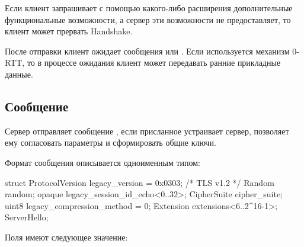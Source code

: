 
Если клиент запрашивает с помощью какого-либо расширения дополнительные 
функциональные возможности, а сервер эти возможности не предоставляет, то 
клиент может прервать Handshake.

После отправки  клиент ожидает сообщения
 или . Если
используется механизм 0-RTT, то в процессе ожидания клиент может передавать
ранние прикладные данные.

\subsection{Сообщение }\label{HS.SH} 

Сервер отправляет сообщение , если присланное 
 устраивает сервер, позволяет ему
согласовать параметры и сформировать общие ключи.

Формат сообщения  описывается одноименным типом:
%
\begin{codeblock}
struct {
  ProtocolVersion legacy_version = 0x0303;    /* TLS v1.2 */
  Random random;
  opaque legacy_session_id_echo<0..32>;
  CipherSuite cipher_suite;
  uint8 legacy_compression_method = 0;
  Extension extensions<6..2^16-1>;
} ServerHello;
\end{codeblock}

Поля  имеют следующее значение:

